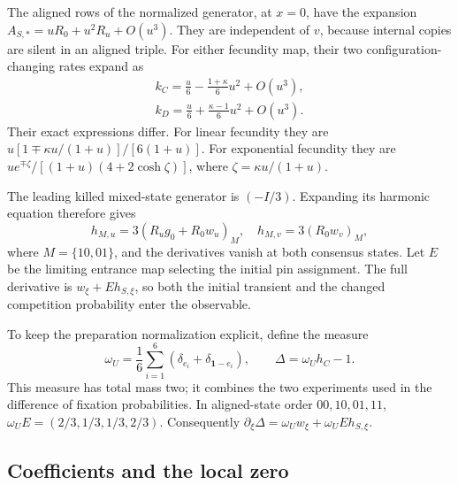 \documentclass[aps,pre,reprint,amsmath,amssymb,longbibliography]{revtex4-2}
\newcommand{\one}{\bm 1}
\begin{document}
The aligned rows of the normalized generator,
at \(x=0\), have the expansion
\(A_{S,*}=uR_0+u^2R_u+O(u^3)\).
They are independent of \(v\), because internal
copies are silent in an aligned triple.
For either fecundity map, their two
configuration-changing rates expand as
\begin{equation}
 \begin{gathered}
 k_C=\frac u6-\frac{1+\kappa}{6}u^2+O(u^3),
 \\
 k_D=\frac u6+\frac{\kappa-1}{6}u^2+O(u^3).
 \end{gathered}
 \label{eq:app-boundary-cross-expansion-v2}
\end{equation}
Their exact expressions differ.
For linear fecundity they are
\(u[1\mp\kappa u/(1+u)]/[6(1+u)]\).
For exponential fecundity they are
\(u e^{\mp\zeta}/[(1+u)(4+2\cosh\zeta)]\),
where \(\zeta=\kappa u/(1+u)\).

The leading killed mixed-state generator is
\((-I/3)\). Expanding its harmonic equation
therefore gives
\begin{equation}
 h_{M,u}=3(R_ug_0+R_0w_u)_M,\quad
 h_{M,v}=3(R_0w_v)_M ,
 \label{eq:app-boundary-slow-derivatives-v2}
\end{equation}
where \(M=\{10,01\}\), and the derivatives
vanish at both consensus states. Let \(E\)
be the limiting entrance map selecting the
initial pin assignment. The full derivative
is \(w_\xi+Eh_{S,\xi}\), so both the initial
transient and the changed competition
probability enter the observable.

To keep the preparation normalization explicit,
define the measure
\begin{equation}
 \omega_U=\frac16\sum_{i=1}^6
       (\delta_{e_i}+\delta_{\one-e_i}),\qquad
 \Delta=\omega_Uh_C-1.
 \label{eq:app-boundary-preparation-v2}
\end{equation}
This measure has total mass two; it combines
the two experiments used in the difference
of fixation probabilities.
In aligned-state order \(00,10,01,11\),
\(\omega_UE=(2/3,1/3,1/3,2/3)\).
Consequently
\(\partial_\xi\Delta=\omega_Uw_\xi+
\omega_UEh_{S,\xi}\).

\subsection{Coefficients and the local zero}
\end{document}

